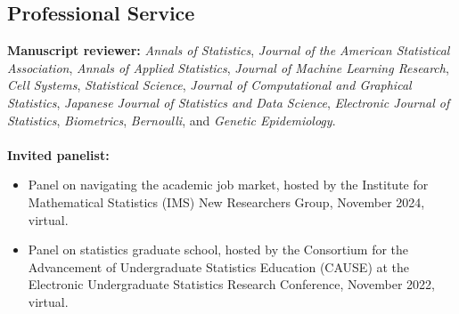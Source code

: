 \documentclass[margin, 10pt]{res}
\begin{document}
\begin{resume}
\section{Professional Service}
\textbf{Manuscript reviewer:} \textit{Annals of Statistics}, \textit{Journal of the American Statistical Association}, \textit{Annals of Applied Statistics}, \textit{Journal of Machine Learning Research}, \textit{Cell Systems}, \textit{Statistical Science}, \textit{Journal of Computational and Graphical Statistics}, \textit{Japanese Journal of Statistics and Data Science}, \textit{Electronic Journal of Statistics}, \textit{Biometrics}, \textit{Bernoulli}, and \textit{Genetic Epidemiology}. \\
\\
\textbf{Invited panelist:}
\begin{itemize}
\item Panel on navigating the academic job market, hosted by the Institute for Mathematical Statistics (IMS) New Researchers Group, November 2024, virtual. 
\item Panel on statistics graduate school, hosted by the Consortium for the Advancement of Undergraduate Statistics Education (CAUSE) at the  Electronic Undergraduate Statistics Research Conference, November 2022, virtual.
\end{itemize}




\end{resume}
\end{document}
